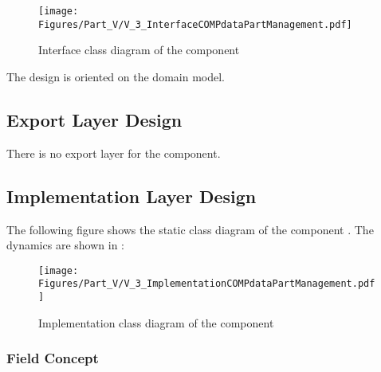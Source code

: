 \begin{figure}[H]
	\centering
	\texttt{[image: Figures/Part\_V/V\_3\_InterfaceCOMPdataPartManagement.pdf]}
	\caption{Interface class diagram of the component \COMPdataPartManagement{}}
	\label{fig:V_3_InterfaceCOMPdataPartManagement}
\end{figure}

The design is oriented on the domain model.


\subsection{Export Layer Design}
\label{sec:ExportDesignCOMPdataPartManagement}

There is no export layer for the \COMPdataPartManagement{} component.


\subsection{Implementation Layer Design}
\label{sec:ImplementationDesignCOMPdataPartManagement}

The following figure shows the static class diagram of the component \COMPdataPartManagement{}. The dynamics are shown in :

\begin{figure}[H]
	\centering
	\texttt{[image: Figures/Part\_V/V\_3\_ImplementationCOMPdataPartManagement.pdf]}
	\caption{Implementation class diagram of the component \COMPdataPartManagement{}}
	\label{fig:V_3_ImplementationCOMPdataPartManagement}
\end{figure}


\subsubsection{Field Concept}
\label{sec:FieldConcept}

